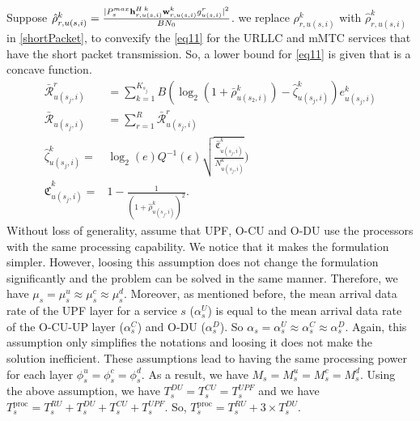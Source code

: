 \documentclass[lettersize,journal]{IEEEtran}
\begin{document}
Suppose $\hat{\rho}_{r,u(s,i)}^{k} =  \frac{|P_{s}^{max}{\bold{h}_{r,u(s,i)}^{H \: k}} \bold{w}_{r,u(s,i)}^{k} g_{u(s,i)}^r|^2}{BN_0}$.
we replace ${\rho}_{r,u(s,i)}^{k}$ with $\hat{\rho}_{r,u(s,i)}^{k}$ in \eqref{shortPacket}, to convexify the \eqref{eq11} for the URLLC and mMTC services that have the short packet transmission.
So, a lower bound for \eqref{eq11} is given that is a concave function.
\begin{subequations}\label{lb1}
\begin{alignat}{4}
\bar{\mathcal{R}}_{u(s_j,i)}^{r} &= \sum_{k=1}^{K_{s_j}} B (\log_2({1+ \bar{\rho}_{u(s_2,i)}^{k}})- \hat{\zeta}_{u(s_j,i)}^{k}){e}_{u(s_j,i)}^{k}\\
\bar{\mathcal{R}}_{u(s_j,i)} &= \sum_{r=1}^{R}\bar{\mathcal{R}}_{u(s_j,i)}^{r}\\
 \hat{\zeta}_{u(s_j,i)}^{k} =& \log_2({e})Q^{-1}(\epsilon) \sqrt{\frac{\hat{\mathfrak{C}}_{u(s_j,i)}^{k}}{N_{u(s_j,i)}^{k}}})\\
 \hat{\mathfrak{C}}_{u(s_j,i)}^{k} =& 1 - \frac{1}{(1+\hat{\rho}_{u(s_j,i)}^{k})^2}.
\end{alignat}
\end{subequations}
Without loss of generality, assume that UPF, O-CU and O-DU use the processors with the same processing capability. We notice that it makes the formulation simpler. However, loosing this assumption does not change the formulation significantly and the problem can be solved in the same manner. Therefore, we have $\mu_s = \mu_s^u \approx \mu_s^c \approx \mu_s^d $. Moreover, as mentioned before,
the mean arrival data rate of the UPF layer for a service $s$ ($\alpha_{s}^U$) is equal to the mean arrival data rate of the O-CU-UP layer ($\alpha_{s}^C$) and O-DU ($\alpha_{s}^D$). So $\alpha_{s} =\alpha_{s}^U \approx \alpha_{s}^C \approx \alpha_{s}^D$. Again, this assumption only simplifies the notations and loosing it does not make the solution inefficient.
These assumptions lead to having the same processing power for each layer $\phi_s^u = \phi_s^c =\phi_s^d $.
As a result, we have $M_s = M_s^u = M_s^c = M_s^d $.
Using the above assumption, we have $T^{DU}_{s} = T^{CU}_{s} = T^{UPF}_{s}$ and we have
$T^{\text{proc}}_{s} =  T^{RU}_{s} + T^{DU}_{s} + T^{CU}_{s} + T^{UPF}_{s}$. So,
$T^{\text{proc}}_{s}=  T^{RU}_{s} + 3\times T^{DU}_{s}.$
\end{document}
